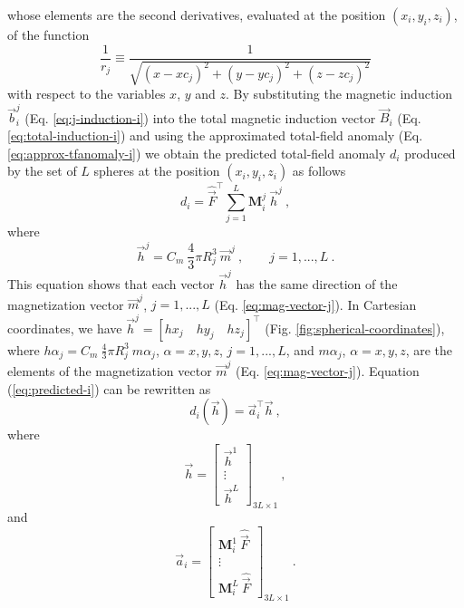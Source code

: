 \documentclass[journal abbreviation, npg]{copernicus}
\begin{document}
whose elements are the second derivatives, evaluated at the position $(x_{i}, y_{i}, z_{i})$, of the function
\begin{equation}
\dfrac{1}{r_{j}} \equiv 
\dfrac{1}{\sqrt{(x - xc_{j})^{2} + 
				(y - yc_{j})^{2} +
				(z - zc_{j})^{2}}}
\label{eq:1/rj}
\end{equation}
with respect to the variables $x$, $y$ and $z$. By substituting the magnetic induction $\vec{b}^{j}_{i}$ (Eq. \ref{eq:j-induction-i}) into the total magnetic induction vector $\vec{B}_i$ (Eq. \ref{eq:total-induction-i}) and using the approximated total-field anomaly (Eq. \ref{eq:approx-tfanomaly-i}) we obtain the predicted total-field anomaly $d_{i}$ produced by the set of $L$ spheres at the position $(x_{i}, y_{i}, z_{i})$ as follows
\begin{equation}
d_{i} = \hat{\vec{F}}^{\intercal} \sum_{j = 1}^{L} \mathbf{M}_{i}^{j} \: \vec{h}^{j} \: ,
\label{eq:predicted-i}
\end{equation}
where
\begin{equation}
\vec{h}^{j} = C_{m} \: \dfrac{4}{3} \pi R_{j}^{3} \: \vec{m}^{j} \: ,
\qquad j = 1, ..., L \: .
\label{eq:hj}
\end{equation}
This equation shows that each vector $\vec{h}^{j}$ has the same direction of the magnetization vector $\vec{m}^{j}$, $j = 1, ..., L$ (Eq. \ref{eq:mag-vector-j}). In Cartesian coordinates, we have $\vec{h}^{j} = \left[hx_{j} \quad hy_{j} \quad hz_{j}\right]^{\intercal}$ (Fig. \ref{fig:spherical-coordinates}), where $h\alpha_{j} = C_{m} \: \frac{4}{3} \pi R_{j}^{3} \: m\alpha_{j}$, $\alpha = x, y, z$, $j = 1, ..., L$, and $m\alpha_{j}$, $\alpha = x, y, z$,  are the elements of the magnetization vector $\vec{m}^{j}$ (Eq. \ref{eq:mag-vector-j}). Equation (\ref{eq:predicted-i}) can be rewritten as
\begin{equation}
d_{i}(\vec{h}) = \vec{a}_{i}^{\intercal} \vec{h} \: ,
\label{eq:aiTh}
\end{equation}
where
\begin{equation}
\vec{h} = 
\left[
\begin{array}{c}
\vec{h}^{1} \\
\vdots \\
\vec{h}^{L}
\end{array}
\right]_{3L \times 1} \: ,
\label{eq:h}
\end{equation}
and
\begin{equation}
\vec{a}_{i} = 
\left[
\begin{array}{c}
\mathbf{M}_{i}^{1} \: \hat{\vec{F}} \\
\vdots \\
\mathbf{M}_{i}^{L} \: \hat{\vec{F}}
\end{array}
\right]_{3L \times 1} \: .
\label{eq:ai}
\end{equation}
\end{document}
